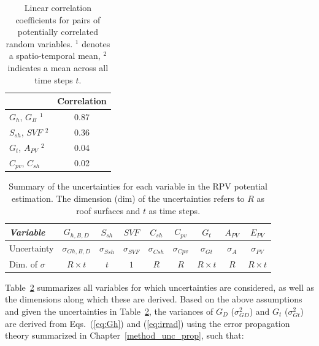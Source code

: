 \begin{table}[tb]
\centering
\footnotesize
\caption{Linear correlation coefficients for pairs of potentially correlated random variables. $^1$ denotes a spatio-temporal mean, $^2$ indicates a mean across all time steps $t$.}
\label{tab:covrr}
\begin{tabular}{lc}
    \hline
                        & \textbf{Correlation}  \\ \hline
    $G_h$, $G_B$ $^1$    & 0.87                  \\
    $S_{sh}$, $\mathit{SVF}$ $^2$  & 0.36                  \\ 
    $G_t$, $A_{PV}$ $^2$  & 0.04                  \\
    $C_{\mathit{pv}}$, $C_{sh}$    & 0.02                  \\   \hline 
\end{tabular}
\end{table}

\begin{table}[tb]
\centering
\footnotesize
\caption{Summary of the uncertainties for each variable in the RPV potential estimation. The dimension (dim) of the uncertainties refers to $R$ as roof surfaces and $t$ as time steps.}
\label{tab:uncs}
\begin{tabular} {lcccccccc}
\hline 
\textit{Variable}  & $G_{h,B,D}$  & $S_{sh}$  & $\mathit{SVF}$ & $C_{sh}$ & $C_{\mathit{pv}}$ & $G_t$  & $A_{PV}$ & $E_{PV}$                  \\
\hline 
Uncertainty    & $\sigma_{Gh,B,D}$    & $\sigma_{\mathit{Ssh}}$     & $\sigma_{\mathit{SVF}}$     & $\sigma_{\mathit{Csh}}$  & $\sigma_{\mathit{Cpv}}$    & $\sigma_{Gt}$   & $\sigma_{A}$     & $\sigma_{PV}$                     \\
Dim. of $\sigma$ & $R \times t$ & $t$ & $1$   & $R$     & $R$     & $R \times t$ & $R$    & $R \times t$ \\
\hline 
\end{tabular}
\end{table}

Table~\ref{tab:uncs} summarizes all variables for which uncertainties are considered, as well as the dimensions along which these are derived.
Based on the above assumptions and given the uncertainties in Table~\ref{tab:uncs}, the variances of $G_D$ ($\sigma^2_{GD}$) and $G_t$ ($\sigma^2_{Gt}$) are derived from Eqs.~(\ref{eq:Gh}) and (\ref{eq:irrad}) using the error propagation theory summarized in Chapter~\ref{method_unc_prop}, such that:

